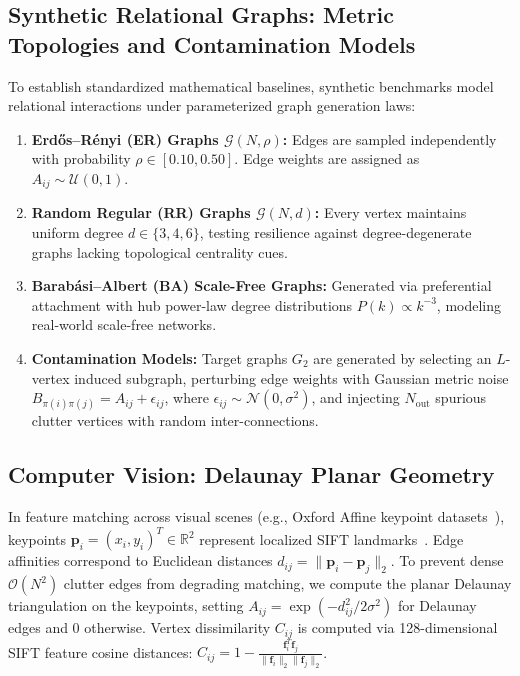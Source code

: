 \documentclass[a4paper,fleqn]{cas-dc}
\theoremstyle{thmstyleone}
\theoremstyle{thmstyletwo}
\theoremstyle{thmstylethree}
\begin{document}
\subsection{Synthetic Relational Graphs: Metric Topologies and Contamination Models}
To establish standardized mathematical baselines, synthetic benchmarks model relational interactions under parameterized graph generation laws:
\begin{enumerate}
    \item \textbf{Erd\H{o}s--R\'enyi (ER) Graphs $\mathcal{G}(N, \rho)$:} Edges are sampled independently with probability $\rho \in [0.10, 0.50]$. Edge weights are assigned as $A_{ij} \sim \mathcal{U}(0, 1)$.
    \item \textbf{Random Regular (RR) Graphs $\mathcal{G}(N, d)$:} Every vertex maintains uniform degree $d \in \{3, 4, 6\}$, testing resilience against degree-degenerate graphs lacking topological centrality cues.
    \item \textbf{Barab\'asi--Albert (BA) Scale-Free Graphs:} Generated via preferential attachment with hub power-law degree distributions $P(k) \propto k^{-3}$, modeling real-world scale-free networks.
    \item \textbf{Contamination Models:} Target graphs $G_2$ are generated by selecting an $L$-vertex induced subgraph, perturbing edge weights with Gaussian metric noise $B_{\pi(i)\pi(j)} = A_{ij} + \epsilon_{ij}$, where $\epsilon_{ij} \sim \mathcal{N}(0, \sigma^2)$, and injecting $N_{\text{out}}$ spurious clutter vertices with random inter-connections.
\end{enumerate}

\subsection{Computer Vision: Delaunay Planar Geometry}
In feature matching across visual scenes (e.g., Oxford Affine keypoint datasets~\cite{mikolajczyk2005comparison}), keypoints $\mathbf{p}_i = (x_i, y_i)^T \in \mathbb{R}^2$ represent localized SIFT landmarks~\cite{lowe2004sift}. Edge affinities correspond to Euclidean distances $d_{ij} = \|\mathbf{p}_i - \mathbf{p}_j\|_2$. To prevent dense $\mathcal{O}(N^2)$ clutter edges from degrading matching, we compute the planar Delaunay triangulation on the keypoints, setting $A_{ij} = \exp(-d_{ij}^2 / 2\sigma^2)$ for Delaunay edges and 0 otherwise. Vertex dissimilarity $C_{ij}$ is computed via 128-dimensional SIFT feature cosine distances: $C_{ij} = 1 - \frac{\mathbf{f}_i^T \mathbf{f}_j}{\|\mathbf{f}_i\|_2 \|\mathbf{f}_j\|_2}$.
\end{document}
